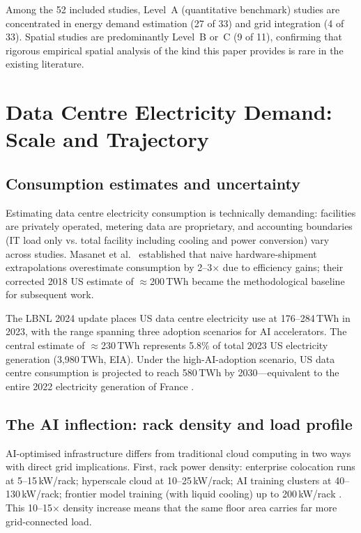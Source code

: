 \documentclass[preprint,12pt]{elsarticle}
\begin{document}
Among the 52 included studies, Level~A (quantitative benchmark) studies
are concentrated in energy demand estimation (27 of 33) and grid
integration (4 of 33). Spatial studies are predominantly Level~B or~C
(9 of 11), confirming that rigorous empirical spatial analysis of the
kind this paper provides is rare in the existing literature.

\section{Data Centre Electricity Demand: Scale and Trajectory}
\label{sec:scale}

\subsection{Consumption estimates and uncertainty}
\label{subsec:scale_current}

Estimating data centre electricity consumption is technically demanding:
facilities are privately operated, metering data are proprietary, and
accounting boundaries (IT load only vs. total facility including cooling
and power conversion) vary across studies. Masanet et al.\
\cite{masanet2020recalibrating} established that naive hardware-shipment
extrapolations overestimate consumption by 2--3$\times$ due to efficiency
gains; their corrected 2018 US estimate of $\approx$200\,TWh became the
methodological baseline for subsequent work.

The LBNL 2024 update \cite{shehabi2024lbnl} places US data centre
electricity use at 176--284\,TWh in 2023, with the range spanning three
adoption scenarios for AI accelerators. The central estimate of
$\approx$230\,TWh represents 5.8\% of total 2023 US electricity generation
(3{,}980\,TWh, EIA). Under the high-AI-adoption scenario, US data centre
consumption is projected to reach 580\,TWh by 2030---equivalent to the
entire 2022 electricity generation of France \cite{gs2024ai}.

\subsection{The AI inflection: rack density and load profile}
\label{subsec:ai_inflection}

AI-optimised infrastructure differs from traditional cloud computing in two
ways with direct grid implications. First, rack power density: enterprise
colocation runs at 5--15\,kW/rack; hyperscale cloud at 10--25\,kW/rack;
AI training clusters at 40--130\,kW/rack; frontier model training
(with liquid cooling) up to 200\,kW/rack \cite{chien2023ai}. This
10--15$\times$ density increase means that the same floor area carries
far more grid-connected load.
\end{document}
